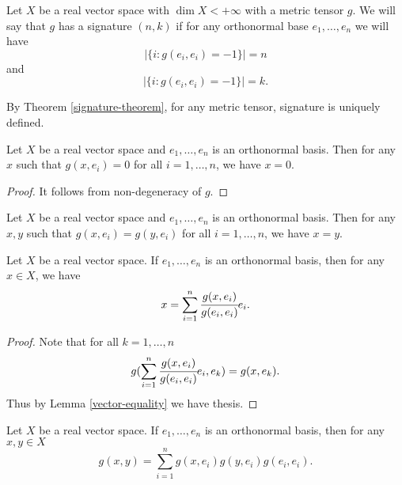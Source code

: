 \documentclass[main.tex]{subfiles}
\begin{document}
\begin{definition}
Let $X$ be a real vector space with $\dim X < +\infty$ with a metric tensor $g$. We will say that $g$ has a signature $(n, k)$ if for any orthonormal base $e_1, \dots, e_n$ we will have 
\begin{equation}
|\{i: g(e_i, e_i) = -1 \}| = n
\end{equation}
and
\begin{equation}
|\{i: g(e_i, e_i) = -1 \}| = k.
\end{equation}
\end{definition}

By Theorem \ref{signature-theorem}, for any metric tensor, signature is uniquely defined. 

\begin{lemma}
Let $X$ be a real vector space and $e_1, \dots, e_n$ is an orthonormal basis. Then for any $x$ such that $g(x, e_i) = 0$ for all $i=1,\dots, n$, we have $x=0$.
\end{lemma}
\begin{proof}
It follows from non-degeneracy of $g$.
\end{proof}
\begin{corollary}
\label{vector-equality}
Let $X$ be a real vector space and $e_1, \dots, e_n$ is an orthonormal basis. Then for any $x,y$ such that $g(x, e_i) = g(y, e_i)$ for all $i=1,\dots, n$, we have $x=y$.
\end{corollary}
\begin{theorem}
Let $X$ be a real vector space. If $e_1, \dots, e_n$ is an orthonormal basis, then for any $x\in X$, we have
\begin{equation}
x = \sum_{i=1}^n \cfrac{g(x,e_i)}{g(e_i, e_i)} e_i.
\end{equation}
\end{theorem}
\begin{proof}
Note that for all $k=1,\dots, n$
\begin{equation}
g(\sum_{i=1}^n \cfrac{g(x, e_i)}{g(e_i, e_i)} e_i, e_k) = g(x, e_k).
\end{equation}
Thus by Lemma \ref{vector-equality} we have thesis.
\end{proof}
\begin{corollary}
Let $X$ be a real vector space. If $e_1, \dots, e_n$ is an orthonormal basis, then for any $x, y\in X$
\begin{equation}
g(x, y) = \sum_{i=1}^n g(x,e_i)g(y,e_i)g(e_i, e_i).
\end{equation}
\end{corollary}
\end{document}
